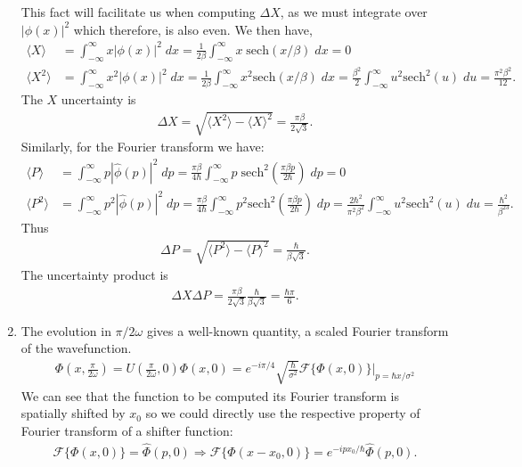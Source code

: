 \documentclass[letterpaper,11pt,twoside]{article}
\newcommand{\braket}[1]{\langle#1\rangle}
\begin{document}
\begin{enumerate}[itemsep=0pt,topsep=0pt,label=\alph*)]
  This fact will facilitate us when computing $\Delta X$, as we must integrate over $|\phi(x)|^2$ which therefore, is also even.
  We then have,
  \begin{align*}
    \braket{X}&=\int_{-\infty}^\infty x|\phi(x)|^2\;dx=\frac{1}{2\beta}\int_{-\infty}^\infty x\;\text{sech}(x/\beta)\;dx=0\\
    \braket{X^2}&=\int_{-\infty}^\infty x^2|\phi(x)|^2\;dx=\frac{1}{2\beta}\int_{-\infty}^\infty x^2\text{sech}(x/\beta)\;dx=\frac{\beta^2}{2}\int_{-\infty}^\infty u^2\text{sech}^2(u)\;du=\frac{\pi^2\beta^2}{12}.
  \end{align*}
  The $X$ uncertainty is 
  \begin{align*}
    \Delta X=\sqrt{\braket{X^2}-\braket{X}^2}=\frac{\pi\beta}{2\sqrt{3}}.
  \end{align*}
  Similarly, for the Fourier transform we have:
  \begin{align*}
    \braket{P}&=\int_{-\infty}^\infty p|\hat{\phi}(p)|^2\;dp=\frac{\pi\beta}{4\hbar}\int_{-\infty}^\infty p\;\text{sech}^2(\frac{\pi\beta p}{2\hbar})\;dp=0\\
    \braket{P^2}&=\int_{-\infty}^\infty p^2|\hat{\phi}(p)|^2\;dp=\frac{\pi\beta}{4\hbar}\int_{-\infty}^\infty p^2\text{sech}^2(\frac{\pi\beta p}{2\hbar})\;dp=\frac{2\hbar^2}{\pi^2\beta^2}\int_{-\infty}^\infty u^2\text{sech}^2(u)\;du=\frac{\hbar^2}{\beta^23}.
  \end{align*}
  Thus 
  \begin{align*}
    \Delta P=\sqrt{\braket{P^2}-\braket{P}^2}=\frac{\hbar}{\beta\sqrt{3}}.
  \end{align*}
  The uncertainty product is 
  \begin{align*}
    \Delta X\Delta P=\frac{\pi\beta}{2\sqrt{3}}\frac{\hbar}{\beta\sqrt{3}}=\frac{\hbar\pi}{6}.
  \end{align*}
  \item The evolution in $\pi/2\omega$ gives a well-known quantity, a scaled Fourier transform of the wavefunction.
  \begin{align*}
    \Phi(x,\frac{\pi}{2\omega})=U(\frac{\pi}{2\omega},0)\Phi(x,0)=e^{-i\pi/4}\sqrt{\frac{\hbar}{\sigma^2}}\mathcal{F}\{\Phi(x,0)\}\bigr|_{p=\hbar x/\sigma^2}
  \end{align*}
  We can see that the function to be computed its Fourier transform is spatially shifted by $x_0$ so we could directly use the respective property of Fourier transform of a shifter function:
  \begin{align*}
    \mathcal{F}\{\Phi(x,0)\}=\hat{\Phi}(p,0)\Longrightarrow \mathcal{F}\{\Phi(x-x_0,0)\}=e^{-ipx_0/\hbar}\hat{\Phi}(p,0).

\end{align*}
\end{enumerate}
\end{document}
